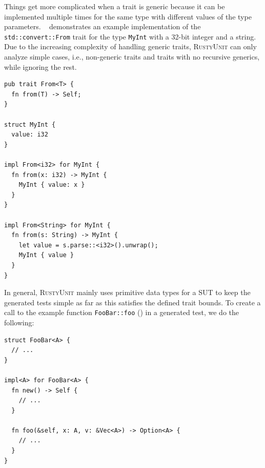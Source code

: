 \documentclass[paper=a4,%
  twoside,%
  BCOR4mm,%
  abstract=true,%
  toc=bibliography,%
  chapterprefix=true,%
  toc=bibliographynumbered,%
  open=right,%
  english,%
  pagesize=pdftex]{scrreprt}
\newcommand{\tech}{\textsc{RustyUnit}\xspace}
\newcommand{\sut}{\ac{SUT}\xspace}
\begin{document}
Things get more complicated when a trait is generic because it can be implemented multiple times for the same type with different values of the type parameters. ~ demonstrates an example implementation of the \texttt{std::convert::From} trait for the type \texttt{MyInt} with a 32-bit integer and a string. Due to the increasing complexity of handling generic traits, \tech can only analyze simple cases, i.e., non-generic traits and traits with no recursive generics, while ignoring the rest.

\begin{lstlisting}[style=boxed, caption={Example implementation of the \texttt{std::convert::From} trait from the Rust standard library}, label=lst:from-trait-example]
pub trait From<T> {
  fn from(T) -> Self;
}

struct MyInt {
  value: i32
}

impl From<i32> for MyInt {
  fn from(x: i32) -> MyInt {
    MyInt { value: x }
  }
}

impl From<String> for MyInt {
  fn from(s: String) -> MyInt {
    let value = s.parse::<i32>().unwrap();
    MyInt { value }
  }
}
\end{lstlisting}


In general, \tech mainly uses primitive data types for a \sut to keep the generated tests simple as far as this satisfies the defined trait bounds. To create a call to the example function \texttt{FooBar::foo} () in a generated test, we do the following:

\begin{lstlisting}[style=boxed, caption={A generic type A is used in multiple parameters and return value}, label=lst:generic-type-used-in-multiple-params]
struct FooBar<A> {
  // ...
}

impl<A> for FooBar<A> {
  fn new() -> Self {
    // ...
  }

  fn foo(&self, x: A, v: &Vec<A>) -> Option<A> {
    // ...
  }
}
\end{lstlisting}
\end{document}

